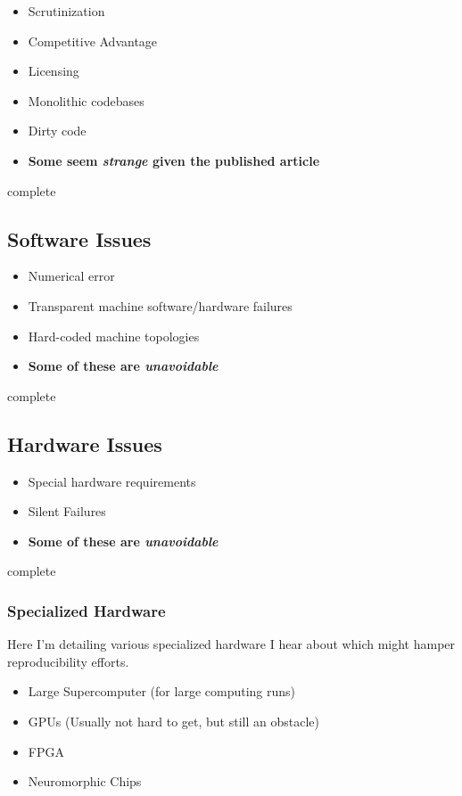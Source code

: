 \documentclass{article}
\newcommand{\complete}{
	\gls{complete}
}
\begin{document}
\begin{itemize}
\item Scrutinization
\item Competitive Advantage
\item Licensing
\item Monolithic codebases
\item Dirty code
\item \textbf{Some seem \textit{strange} given the published article}
\end{itemize}

\complete

\subsection{Software Issues}

\begin{itemize}
\item Numerical error
\item Transparent machine software/hardware failures
\item Hard-coded machine topologies
\item \textbf{Some of these are \textit{unavoidable}}
\end{itemize}

\complete

\subsection{Hardware Issues}

\begin{itemize}
\item Special hardware requirements
\item Silent Failures
\item \textbf{Some of these are \textit{unavoidable}}
\end{itemize}

\complete

\subsubsection{Specialized Hardware}

Here I'm detailing various specialized hardware I hear about which might hamper reproducibility efforts.

\begin{itemize}
\item Large Supercomputer (for large computing runs)
\item GPUs (Usually not hard to get, but still an obstacle)
\item FPGA
\item Neuromorphic Chips \cite{neuromorphic-chips-webarticle}
\end{itemize}
\end{document}
